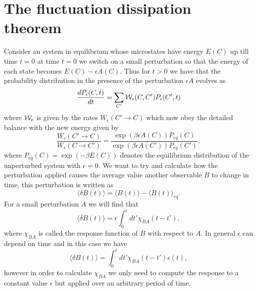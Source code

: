 \documentclass[11pt]{report}
\begin{document}
\section{The fluctuation dissipation theorem}
Consider an  system in equilibrium whose microstates have energy $E(C)$ up till time 
$t=0$ at time $t=0$ we switch on a small perturbation so that the energy of each state becomes $E(C) -\epsilon A(C)$. Thus for $t>0$ we have that the probability distribution in the  presence of the perturbation $\epsilon A$ evolves as 
\begin{equation}
\frac{dP_{\epsilon}(C,t)}{dt} = \sum_{C'} {\cal W}_\epsilon(C,C') P_\epsilon(C',t)
\end{equation}
where ${\cal W}_\epsilon$ is given by the rates $W_\epsilon(C'\to C)$ which now obey the detailed balance with the new energy given by
\begin{equation}
\frac{W_\epsilon(C'\to C)}{W_\epsilon(C\to C')} = \frac{\exp\left(\beta \epsilon A(C)\right)P_{eq}(C)}{\exp\left(\beta \epsilon A(C')\right)P_{eq}(C')},\label{dba}
\end{equation}
where $P_{eq}(C)= \exp\left(-\beta E(C)\right)$ denotes the equilibrium distribution of the unperturbed system with $\epsilon=0$. We want to try and calculate how the perturbation applied
causes the average value another observable $B$ to change in time, this perturbation is written as
\begin{equation}
\langle \delta B(t)\rangle = \langle B(t)\rangle - \langle B(t)\rangle_{eq}.
\end{equation}
For a small perturbation $A$ we will find that
\begin{equation}
\langle \delta B(t)\rangle = \epsilon\int_0^t  dt' \chi_{BA}(t-t'),
\end{equation}
where $\chi_{BA}$ is called the response function of $B$ with respect to $A$.
In general $\epsilon$ can depend on time and in this case we have
\begin{equation}
\boxed{
\langle \delta B(t)\rangle = \int_0^t dt'\chi_{BA}(t-t')\epsilon(t),}\label{chiab}
\end{equation}
however in order to calculate $\chi_{BA}$ we only need to compute the response to a constant value $\epsilon$ but applied over an arbitrary period of time.
\end{document}
